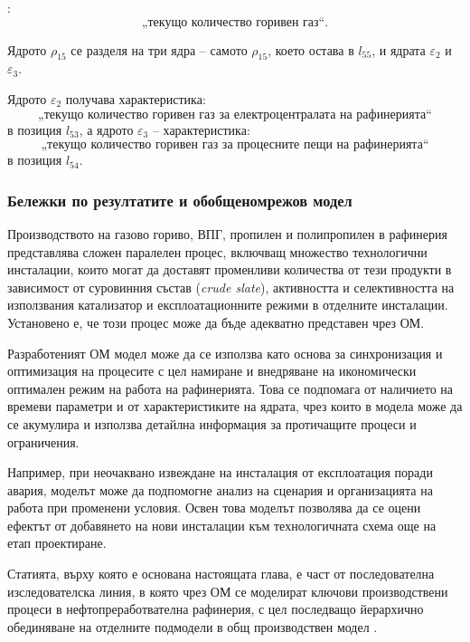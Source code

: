\vspace{0.1em}

:
$$„\mbox{текущо количество горивен газ}“.$$

Ядрото $\rho_{15}$ се разделя на три ядра -- самото $\rho_{15}$, което остава в $l_{55}$, и ядрата $\varepsilon_2$ и $\varepsilon_3$.

Ядрото $\varepsilon_2$ получава характеристика:
$$„\mbox{текущо количество горивен газ за електроцентралата на рафинерията}“$$
в позиция $l_{53}$, а ядрото $\varepsilon_3$ -- характеристика:
$$„\mbox{текущо количество горивен газ за процесните пещи на рафинерията}“$$
в позиция $l_{54}$.

\subsubsection{Бележки по резултатите и обобщеномрежов модел}

\hspace*{2.5em}Производството на газово гориво, ВПГ, пропилен и полипропилен в рафинерия представлява сложен паралелен процес, включващ множество технологични инсталации, които могат да доставят променливи количества от тези продукти в зависимост от суровинния състав (\textit{crude slate}), активността и селективността на използвания катализатор и експлоатационните режими в отделните инсталации. Установено е, че този процес може да бъде адекватно представен чрез ОМ.

Разработеният ОМ модел може да се използва като основа за синхронизация и оптимизация на процесите с цел намиране и внедряване на икономически оптимален режим на работа на рафинерията. Това се подпомага от наличието на времеви параметри и от характеристиките на ядрата, чрез които в модела може да се акумулира и използва детайлна информация за протичащите процеси и ограничения.

Например, при неочаквано извеждане на инсталация от експлоатация поради авария, моделът може да подпомогне анализ на сценария и организацията на работа при променени условия. Освен това моделът позволява да се оцени ефектът от добавянето на нови инсталации към технологичната схема още на етап проектиране.

Статията, върху която е основана настоящата глава, е част от последователна изследователска линия, в която чрез ОМ се моделират ключови производствени процеси в нефтопреработвателна рафинерия, с цел последващо йерархично обединяване на отделните подмодели в общ производствен модел \cite{Stratiev2021_DieselGN, Stratiev2024_RefineryGN_PartI, Stratiev2025_HOilFeedVariability}.

